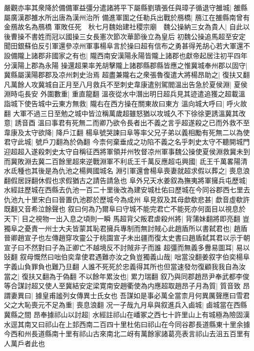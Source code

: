 嚴觀亦率其衆降於備備軍益彊分遣諸將平下屬縣劉璝張任與璋子循退守雒城|{
	雒縣屬廣漢郡雒水所出唐為漢州治所}
備進軍圍之任勒兵出戰於鴈橋|{
	鴈江在雒縣南曾有金鴈故名為鴈橋}
軍敗任死　秋七月魏始建社稷宗廟　魏公操納三女為貴人|{
	自此以後曹操不書姓而冠以國操三女長憲次節次華節後立為皇后}
初魏公操追馬超至安定聞田銀蘇伯反引軍還參凉州軍事楊阜言於操曰超有信布之勇甚得羌胡心若大軍還不設備隴上諸郡非國家之有也|{
	隴西南安漢陽永陽皆隴上諸郡也獻帝起居注初平四年分漢陽上郡為永陽}
操還超果率羌胡擊隴上諸郡縣郡縣皆應之惟冀城奉州郡以固守|{
	冀縣屬漢陽郡郡及凉州刺史治焉}
超盡兼隴右之衆張魯復遣大將楊昂助之|{
	復扶又翻}
凡萬餘人攻冀城自正月至八月救兵不至刺史韋康遣别駕閻溫出告急於夏侯淵|{
	夏侯淵時屯長安}
外圍數重|{
	重直龍翻}
溫夜從水中潛出明日超兵見其迹遣追獲之超載溫詣城下使告城中云東方無救|{
	隴右在西方操在關東故曰東方}
溫向城大呼曰|{
	呼火故翻}
大軍不過三日至勉之城中皆泣稱萬歲超雖怒猶以攻城久不下徐徐更誘溫冀其改意|{
	誘音酉}
溫曰事君有死無二而卿乃欲令長者出不義之言乎超遂殺之已而外救不至韋康及太守欲降|{
	降戶江翻}
楊阜號哭諫曰阜等率父兄子弟以義相勵有死無二以為使君守此城|{
	號戶刀翻為於偽翻}
今柰何棄垂成之功陷不義之名乎刺史太守不聽開城門迎超超入遂殺刺史太守自稱征西將軍領并州牧督凉州軍事魏公操使夏侯淵救冀未到而冀敗淵去冀二百餘里超來逆戰淵軍不利氐王千萬反應超屯興國|{
	氐王千萬畧陽清水氐種也其後是為仇池之楊興國城名}
淵引軍還會楊阜喪妻就超求假以葬之|{
	喪息浪翻假居訝翻休假也求假猶古之請告請急也}
阜外兄天水姜叙為撫夷將軍擁兵屯歷城|{
	水經註歷城在西縣去仇池一百二十里後改為建安城杜佑曰歷城在今同谷郡西七里去仇池九十里宋白曰晉置仇池郡於歷城今為成州}
阜見叙及其母歔欷悲甚|{
	歔音虛欷許既翻又音希泣餘聲也}
叙曰何為乃爾阜曰守城不能完君亡不能死亦何面目以視息於天下|{
	目之視物一出入息之頃則一瞬}
馬超背父叛君虐殺州將|{
	背蒲妹翻將即亮翻}
豈獨阜之憂責一州士大夫皆蒙其恥君擁兵專制而無討賊心此趙盾所以書弑君也|{
	趙盾晉卿趙宣子也左傳趙穿攻靈公于桃園宣子未出疆而復太史書曰趙盾弑其君以示于朝宣子曰不然對曰子為正卿亡不越境反不討賊非子而誰}
超彊而無義多釁易圖耳|{
	易以䜴翻}
叙母慨然曰咄伯奕韋使君遇難亦汝之負豈獨義山哉|{
	咄當没翻姜叙字伯奕楊阜字義山負罪負也難乃旦翻}
人誰不死死於忠義得其所也但當速發勿復顧我我自為汝當之|{
	復扶又翻為于偽翻}
不以餘年累汝也|{
	累力瑞翻}
叙乃與同郡趙昂尹奉武都李俊等合謀討超又使人至冀結安定梁寛南安趙衢使為内應超取趙昂子月為質|{
	質音致}
昂謂妻異曰|{
	據皇甫謐列女傳異士氏女也}
吾謀如是事必萬全當柰月何異厲聲應曰雪君父之大恥喪元不足為重|{
	喪息浪翻}
况一子哉九月阜與叙進兵入鹵城|{
	鹵城當在西縣冀縣之間}
昂奉據祁山以討超|{
	水經註祁山在嶓冢之西七十許里山上有城極為險固漢水逕其南又曰祁山在上邽西南二百四十里杜佑曰祁山在今同谷郡長道縣東十里余據今西和州長道縣南十里有祁山古來南北二岈有萬餘家諸葛亮表言祁山去沮五百里有人萬戶者此也}
